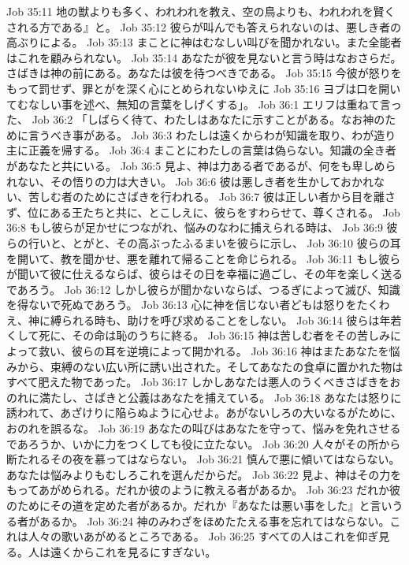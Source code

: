 Job 35:11  地の獣よりも多く、われわれを教え、空の鳥よりも、われわれを賢くされる方である』と。
Job 35:12  彼らが叫んでも答えられないのは、悪しき者の高ぶりによる。
Job 35:13  まことに神はむなしい叫びを聞かれない。また全能者はこれを顧みられない。
Job 35:14  あなたが彼を見ないと言う時はなおさらだ。さばきは神の前にある。あなたは彼を待つべきである。
Job 35:15  今彼が怒りをもって罰せず、罪とがを深く心にとめられないゆえに
Job 35:16  ヨブは口を開いてむなしい事を述べ、無知の言葉をしげくする」。
Job 36:1  エリフは重ねて言った、
Job 36:2  「しばらく待て、わたしはあなたに示すことがある。なお神のために言うべき事がある。
Job 36:3  わたしは遠くからわが知識を取り、わが造り主に正義を帰する。
Job 36:4  まことにわたしの言葉は偽らない。知識の全き者があなたと共にいる。
Job 36:5  見よ、神は力ある者であるが、何をも卑しめられない、その悟りの力は大きい。
Job 36:6  彼は悪しき者を生かしておかれない、苦しむ者のためにさばきを行われる。
Job 36:7  彼は正しい者から目を離さず、位にある王たちと共に、とこしえに、彼らをすわらせて、尊くされる。
Job 36:8  もし彼らが足かせにつながれ、悩みのなわに捕えられる時は、
Job 36:9  彼らの行いと、とがと、その高ぶったふるまいを彼らに示し、
Job 36:10  彼らの耳を開いて、教を聞かせ、悪を離れて帰ることを命じられる。
Job 36:11  もし彼らが聞いて彼に仕えるならば、彼らはその日を幸福に過ごし、その年を楽しく送るであろう。
Job 36:12  しかし彼らが聞かないならば、つるぎによって滅び、知識を得ないで死ぬであろう。
Job 36:13  心に神を信じない者どもは怒りをたくわえ、神に縛られる時も、助けを呼び求めることをしない。
Job 36:14  彼らは年若くして死に、その命は恥のうちに終る。
Job 36:15  神は苦しむ者をその苦しみによって救い、彼らの耳を逆境によって開かれる。
Job 36:16  神はまたあなたを悩みから、束縛のない広い所に誘い出された。そしてあなたの食卓に置かれた物はすべて肥えた物であった。
Job 36:17  しかしあなたは悪人のうくべきさばきをおのれに満たし、さばきと公義はあなたを捕えている。
Job 36:18  あなたは怒りに誘われて、あざけりに陥らぬように心せよ。あがないしろの大いなるがために、おのれを誤るな。
Job 36:19  あなたの叫びはあなたを守って、悩みを免れさせるであろうか、いかに力をつくしても役に立たない。
Job 36:20  人々がその所から断たれるその夜を慕ってはならない。
Job 36:21  慎んで悪に傾いてはならない。あなたは悩みよりもむしろこれを選んだからだ。
Job 36:22  見よ、神はその力をもってあがめられる。だれか彼のように教える者があるか。
Job 36:23  だれか彼のためにその道を定めた者があるか。だれか『あなたは悪い事をした』と言いうる者があるか。
Job 36:24  神のみわざをほめたたえる事を忘れてはならない。これは人々の歌いあがめるところである。
Job 36:25  すべての人はこれを仰ぎ見る。人は遠くからこれを見るにすぎない。
